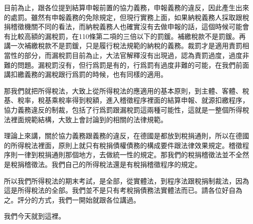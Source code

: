 \documentclass[]{ctexbook}
\begin{document}
目前為止，跟各位提到結算申報前置的協力義務，申報義務的違反，因此產生出來的處罰。雖然有申報義務的免除規定，但現行實務上面，如果納稅義務人採取跟稅捐稽徵機關不同的看法，而納稅義務人也確實沒有去做申報的話，這個時候可能會有比較高額的漏稅罰，在110條第二項的三倍以下的罰鍰。補繳稅款不是罰鍰。再講一次補繳稅款不是罰鍰，只是履行稅法規範的納稅的義務。裁罰才是適用責罰相當性的部分，而漏稅罰目前為止，大法官解釋沒有出現過，認為責罰過度，過度非難的問題。漏稅罰沒有，但行爲罰是有的，行爲罰有過度非難的可能，在我們前面講扣繳義務的漏稅跟行爲罰的時候，也有同樣的適用。

那我們就把所得稅法，大致上從所得稅法的應適用的基本原則，到主體、客體、稅基、稅率，稅基乘稅率得到稅額，進入稽徵程序裡面的結算申報、就源扣繳程序，協力義務違反的制裁，包括了行爲罰跟漏稅罰這兩種可能性，這就是一整個所得稅法裡面規範結構，大致上會討論到的相關的法律規範。

理論上來講，關於協力義務跟義務的違反，在德國是都放到稅捐通則，所以在德國的所得稅法裡面，原則上就只有稅捐債權債務的構成要件跟法律效果規定。稽徵程序則一律到稅捐通則那個地方，去做統一性的規定。那我們的稅捐稽徵法並不全然是稅捐稽徵法。我們自己的所得稅法還是有稅捐稽徵程序的規定。

所以我們所得稅法的期末考試，是全部，從實體法，到程序法跟稅捐制裁法，因為這是所得稅法的全部。我們並不是只有考稅捐債務法實體法而已。請各位好自為之。評分的方式，我們一開始就跟各位講過。

我們今天就到這裡。



\backmatter
\printindex
\end{document}
